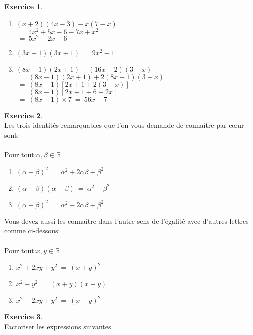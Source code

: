 \documentclass[10pt,a4paper]{article}
\theoremstyle{definition}
\theoremstyle{definition}
\newtheorem{exo}{Exercice}
\begin{document}
\begin{center}
\begin{minipage}[c]{0.4\linewidth}
\begin{exo}
				\begin{enumerate}
					\item $(x+2)(4x-3)-x(7-x)$ \\ $\ = \ 4x^2+5x-6-7x+x^2$\\
					$ \ = \ 5x^2-2x-6$  
					\item $(3x-1)(3x+1) \ = \ 9x^2-1$
					
					\item $(8x-1)(2x+1)+(16x-2)(3-x)$\\
					$ \ = \ (8x-1)(2x+1)+2(8x-1)(3-x)$\\ 
					$ \ = \ (8x-1)\left[2x+1+2(3-x)\right] $\\
					$ \ = \ (8x-1)\left[2x+1+6-2x\right]$\\
					$ \ = \ (8x-1)\times 7 \ = \ 56x - 7$ 
					
				\end{enumerate}

		\end{exo}
	\begin{exo}\quad\hfill\textbf{}\\
		Les trois identités remarquables que l'on vous demande de connaître par cœur sont:\\~\\
		Pour tout:\quad $\alpha, \beta\in\mathbb{R}$
		\begin{enumerate}
			\item $(\alpha + \beta)^2 \ = \  \alpha^2 + 2\alpha\beta + \beta^2$
			\item $(\alpha+\beta)(\alpha-\beta) \ = \ \alpha^2 - \beta^2 $
			\item $(\alpha - \beta)^2  \ = \ \alpha^2 - 2\alpha\beta + \beta^2$
		\end{enumerate}
	\end{exo}
	\end{minipage}
	\hfill\vrule\hfill
	\begin{minipage}[c]{0.4\linewidth}
		\raggedright
		Vous devez aussi les connaître dans l'autre sens de l'égalité avec d'autres lettres comme ci-dessous:\\~\\
		Pour tout:\quad $x, y\in\mathbb{R}$
		\begin{enumerate}
			\item $ x^2 + 2xy + y^2 \ = \ (x + y)^2  $
			\item $x^2 - y^2 \ = \ (x+y)(x-y)  $
			\item $x^2 - 2xy + y^2  \ = \ (x - y)^2$
		\end{enumerate}  
		\begin{exo}\quad\hfill\textbf{}\\
			 Factoriser les expressions suivantes.
	

\end{exo}
\end{minipage}
\end{center}
\end{document}
